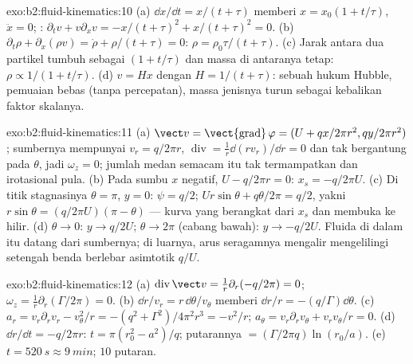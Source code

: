 \begin{solution}{exo:b2:fluid-kinematics:10}
(a) $\dd x/\dd t = x/(t + \tau)$ memberi $x = x_0(1 + t/\tau)$, $\ddot x = 0$;
: $\partial_tv + v\partial_xv = -x/(t + \tau)^2 + x/(t + \tau)^2
= 0$. (b) $\partial_t\rho + \partial_x(\rho v) = \dot\rho + \rho/(t + \tau) = 0$: $\rho =
\rho_0\tau/(t + \tau)$. (c) Jarak antara dua partikel tumbuh sebagai $(1 + t/\tau)$
dan massa di antaranya tetap: $\rho \propto 1/(1 + t/\tau)$. (d) $v =
Hx$ dengan $H = 1/(t + \tau)$: sebuah hukum Hubble, pemuaian bebas (tanpa
percepatan), massa jenisnya turun sebagai kebalikan faktor skalanya.
\end{solution}

\begin{solution}{exo:b2:fluid-kinematics:11}
(a) $\vect v = \operatorname{\vect{grad}}\varphi = (U + qx/2\pi r^2, qy/2\pi r^2)$;
sumbernya mempunyai $v_r = q/2\pi r$, $\operatorname{div} = \frac1r\dd(rv_r)/\dd r
= 0$ dan tak bergantung pada $\theta$, jadi $\omega_z = 0$; jumlah medan semacam itu
tak termampatkan dan irotasional pula. (b) Pada sumbu $x$ negatif,
$U - q/2\pi r = 0$: $x_s = -q/2\pi U$. (c) Di titik stagnasinya $\theta =
\pi$, $y = 0$: $\psi = q/2$;  $Ur\sin\theta + q\theta/2\pi = q/2$,
yakni $r\sin\theta = (q/2\pi U)(\pi - \theta)$ --- kurva yang berangkat dari $x_s$ dan
membuka ke hilir. (d) $\theta \to 0$: $y \to q/2U$; $\theta \to 2\pi$ (cabang
bawah): $y \to -q/2U$. Fluida di dalam  itu datang dari
sumbernya; di luarnya, arus seragamnya mengalir mengelilingi setengah benda
berlebar asimtotik $q/U$.
\end{solution}

\begin{solution}{exo:b2:fluid-kinematics:12}
(a) $\operatorname{div}\vect v = \frac1r\partial_r(-q/2\pi) = 0$; $\omega_z =
\frac1r\partial_r(\Gamma/2\pi) = 0$. (b) $\dd r/v_r = r\,\dd\theta/v_\theta$ memberi
$\dd r/r = -(q/\Gamma)\dd\theta$. (c) $a_r = v_r\partial_rv_r - v_\theta^2/r =
-(q^2 + \Gamma^2)/4\pi^2r^3 = -v^2/r$; $a_\theta = v_r\partial_rv_\theta + v_rv_\theta/r
= 0$. (d) $\dd r/\dd t = -q/2\pi r$: $t = \pi(r_0^2 - a^2)/q$; putarannya
$= (\Gamma/2\pi q)\ln(r_0/a)$. (e) $t = \qty{520}{s} \approx \qty{9}{min}$; $10$
putaran.
\end{solution}

